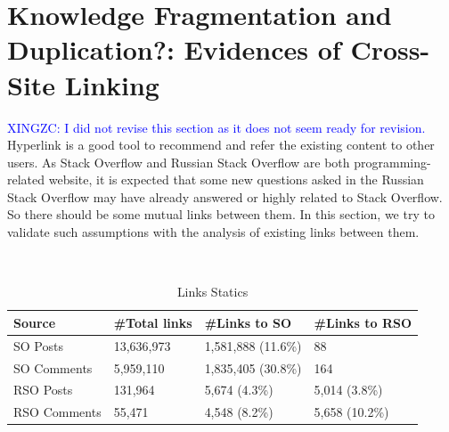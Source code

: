 \section{Knowledge Fragmentation and Duplication?: Evidences of Cross-Site Linking}
\textcolor{blue}{XINGZC: I did not revise this section as it does not seem ready for revision.}
Hyperlink is a good tool to recommend and refer the existing content to other users. 
As Stack Overflow and Russian Stack Overflow are both programming-related website, it is expected that some new questions asked in the Russian Stack Overflow may have already answered or highly related to Stack Overflow.
So there should be some mutual links between them.
In this section, we try to validate such assumptions with the analysis of existing links between them.

\noindent {}
\\

\begin{table}
	\caption{Links Statics}
	\centering
	\small
	\label{tab:links}
	\begin{tabular}{llll}
       \hline
		Source       &\#Total links & \#Links to SO   & \#Links to RSO\\ \hline
		SO Posts     & 13,636,973    & 1,581,888 (11.6\%)      & 88 \\
		SO Comments  & 5,959,110     & 1,835,405 (30.8\%)    & 164\\
		RSO Posts    & 131,964       & 5,674  (4.3\%)        & 5,014 (3.8\%) \\
		RSO Comments & 55,471        & 4,548  (8.2\%)        & 5,658 (10.2\%) \\
       \hline
	\end{tabular}

\end{table}	

